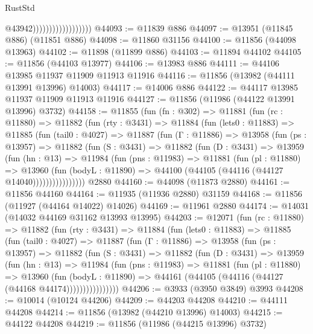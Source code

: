 \begin{lexlean}{RustStd}
\begin{coremodule}
                                        @43942))))))))))))))))))
@44093 := @11839 @886
@44097 := @13951 (@11845 @886) (@11851 @886)
@44098 := @11860 @31156
@44100 := @11856 (@44098 @13963)
@44102 := @11898 (@11899 @886)
@44103 := @11894 @44102
@44105 := @11856 (@44103 @13977)
@44106 := @13983 @886
@44111 := @44106 @13985 @11937 @11909 @11913 @11916
@44116 := @11856 (@13982 (@44111 @13991 @13996) @14003)
@44117 := @14006 @886
@44122 := @44117 @13985 @11937 @11909 @11913 @11916
@44127 := @11856 (@11986 (@44122 @13991 @13996) @3732)
@44158 := @11855
    (fun (fn : @302) =>
    @11881
      (fun (rc : @11880) =>
      @11882
        (fun (rty : @3431) =>
        @11884
          (fun (lets0 : @11883) =>
          @11885
            (fun (tail0 : @4027) =>
            @11887
              (fun (Γ : @11886) =>
              @13958
                (fun (ps : @13957) =>
                @11882
                  (fun (S : @3431) =>
                  @11882
                    (fun (D : @3431) =>
                    @13959
                      (fun (hn : @13) =>
                      @11984
                        (fun (pns : @11983) =>
                        @11881
                          (fun (pl : @11880) =>
                          @13960
                            (fun (bodyL : @11890) =>
                            @44100 (@44105 (@44116 (@44127 @14040))))))))))))))))
    @2880
@44160 := @44098 (@11873 @2880)
@44161 := @11856 @44160
@44164 := @11935 (@11936 @2880) @31159
@44168 := @11856 (@11927 (@44164 @14022) @14026)
@44169 := @11961 @2880
@44174 := @14031 (@14032 @44169 @31162 @13993 @13995)
@44203 := @12071
    (fun (rc : @11880) =>
    @11882
      (fun (rty : @3431) =>
      @11884
        (fun (lets0 : @11883) =>
        @11885
          (fun (tail0 : @4027) =>
          @11887
            (fun (Γ : @11886) =>
            @13958
              (fun (ps : @13957) =>
              @11882
                (fun (S : @3431) =>
                @11882
                  (fun (D : @3431) =>
                  @13959
                    (fun (hn : @13) =>
                    @11984
                      (fun (pns : @11983) =>
                      @11881
                        (fun (pl : @11880) =>
                        @13960
                          (fun (bodyL : @11890) =>
                          @44161 (@44105 (@44116 (@44127 (@44168 @44174))))))))))))))))
@44206 := @3933 (@3950 @3849) @3993
@44208 := @10014 (@10124 @44206)
@44209 := @44203 @44208
@44210 := @44111 @44208
@44214 := @11856 (@13982 (@44210 @13996) @14003)
@44215 := @44122 @44208
@44219 := @11856 (@11986 (@44215 @13996) @3732)

\end{coremodule}
\end{lexlean}
